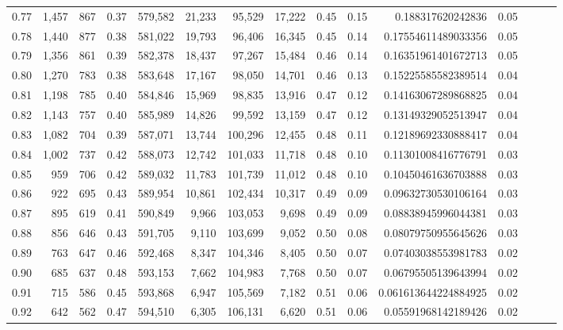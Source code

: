 \begin{tabular}{rrrrrrrrrrrrrrr}
0.77 &   1,457 &    867 &  0.37 &  579,582 &   21,233 &   95,529 &   17,222 &  0.45 &  0.15 &     0.188317620242836 &      0.05 \\
0.78 &   1,440 &    877 &  0.38 &  581,022 &   19,793 &   96,406 &   16,345 &  0.45 &  0.14 &   0.17554611489033356 &      0.05 \\
0.79 &   1,356 &    861 &  0.39 &  582,378 &   18,437 &   97,267 &   15,484 &  0.46 &  0.14 &   0.16351961401672713 &      0.05 \\
0.80 &   1,270 &    783 &  0.38 &  583,648 &   17,167 &   98,050 &   14,701 &  0.46 &  0.13 &   0.15225585582389514 &      0.04 \\
0.81 &   1,198 &    785 &  0.40 &  584,846 &   15,969 &   98,835 &   13,916 &  0.47 &  0.12 &   0.14163067289868825 &      0.04 \\
0.82 &   1,143 &    757 &  0.40 &  585,989 &   14,826 &   99,592 &   13,159 &  0.47 &  0.12 &   0.13149329052513947 &      0.04 \\
0.83 &   1,082 &    704 &  0.39 &  587,071 &   13,744 &  100,296 &   12,455 &  0.48 &  0.11 &   0.12189692330888417 &      0.04 \\
0.84 &   1,002 &    737 &  0.42 &  588,073 &   12,742 &  101,033 &   11,718 &  0.48 &  0.10 &   0.11301008416776791 &      0.03 \\
0.85 &     959 &    706 &  0.42 &  589,032 &   11,783 &  101,739 &   11,012 &  0.48 &  0.10 &   0.10450461636703888 &      0.03 \\
0.86 &     922 &    695 &  0.43 &  589,954 &   10,861 &  102,434 &   10,317 &  0.49 &  0.09 &   0.09632730530106164 &      0.03 \\
0.87 &     895 &    619 &  0.41 &  590,849 &    9,966 &  103,053 &    9,698 &  0.49 &  0.09 &   0.08838945996044381 &      0.03 \\
0.88 &     856 &    646 &  0.43 &  591,705 &    9,110 &  103,699 &    9,052 &  0.50 &  0.08 &   0.08079750955645626 &      0.03 \\
0.89 &     763 &    647 &  0.46 &  592,468 &    8,347 &  104,346 &    8,405 &  0.50 &  0.07 &   0.07403038553981783 &      0.02 \\
0.90 &     685 &    637 &  0.48 &  593,153 &    7,662 &  104,983 &    7,768 &  0.50 &  0.07 &   0.06795505139643994 &      0.02 \\
0.91 &     715 &    586 &  0.45 &  593,868 &    6,947 &  105,569 &    7,182 &  0.51 &  0.06 &  0.061613644224884925 &      0.02 \\
0.92 &     642 &    562 &  0.47 &  594,510 &    6,305 &  106,131 &    6,620 &  0.51 &  0.06 &   0.05591968142189426 &      0.02 \\

\end{tabular}

